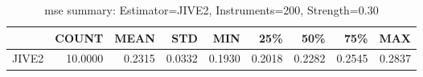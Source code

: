 \begin{table}[ht]
\centering
\caption{mse summary: Estimator=JIVE2, Instruments=200, Strength=0.30}
\begin{tabular}{lrrrrrrrr}
\toprule
 & COUNT & MEAN & STD & MIN & 25\% & 50\% & 75\% & MAX \\
\midrule
JIVE2 & 10.0000 & 0.2315 & 0.0332 & 0.1930 & 0.2018 & 0.2282 & 0.2545 & 0.2837 \\
\bottomrule
\end{tabular}
\end{table}
